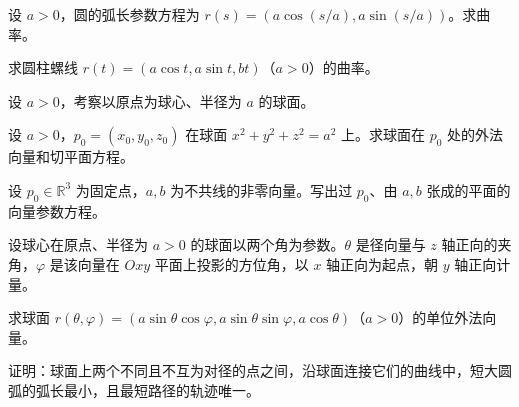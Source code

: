 \noindent\begin{minipage}{\textwidth}
设 $a>0$，圆的弧长参数方程为 $r(s)=(a\cos(s/a),a\sin(s/a))$。求曲率。
\end{minipage}\par\vfill
\noindent\begin{minipage}{\textwidth}
求圆柱螺线 $r(t)=(a\cos t,a\sin t,bt)$（$a>0$）的曲率。
\end{minipage}\par\vfill
\newpage
\noindent\begin{minipage}{\textwidth}
设 $a>0$，考察以原点为球心、半径为 $a$ 的球面。
\end{minipage}\par\vfill
\noindent\begin{minipage}{\textwidth}
设 $a>0$，$p_0=(x_0,y_0,z_0)$ 在球面 $x^2+y^2+z^2=a^2$ 上。求球面在 $p_0$ 处的外法向量和切平面方程。
\end{minipage}\par\vfill
\noindent\begin{minipage}{\textwidth}
设 $p_0\in\mathbb R^3$ 为固定点，$a,b$ 为不共线的非零向量。写出过 $p_0$、由 $a,b$ 张成的平面的向量参数方程。
\end{minipage}\par\vfill
\newpage
\noindent\begin{minipage}{\textwidth}
设球心在原点、半径为 $a>0$ 的球面以两个角为参数。$\theta$ 是径向量与 $z$ 轴正向的夹角，$\varphi$ 是该向量在 $Oxy$ 平面上投影的方位角，以 $x$ 轴正向为起点，朝 $y$ 轴正向计量。
\end{minipage}\par\vfill
\noindent\begin{minipage}{\textwidth}
求球面 $r(\theta,\varphi)=(a\sin\theta\cos\varphi,a\sin\theta\sin\varphi,a\cos\theta)$（$a>0$）的单位外法向量。
\end{minipage}\par\vfill
\noindent\begin{minipage}{\textwidth}
证明：球面上两个不同且不互为对径的点之间，沿球面连接它们的曲线中，短大圆弧的弧长最小，且最短路径的轨迹唯一。
\end{minipage}\par\vfill
